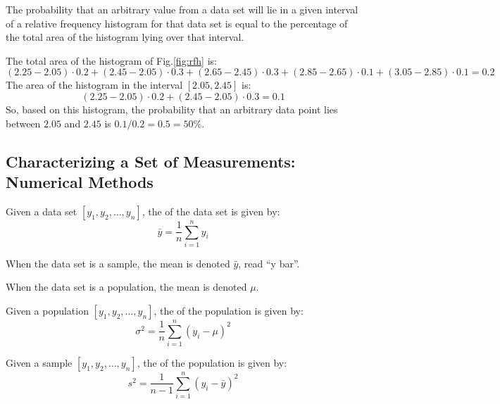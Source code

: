\begin{note}
    The probability that an arbitrary value from a data set will lie in a given interval of a relative frequency histogram for that data set is equal to the percentage of the total area of the histogram lying over that interval.
\end{note}

\begin{exmp}
    The total area of the histogram of Fig.\ref{fig:rfh} is: $$(2.25 - 2.05)\cdot 0.2 + (2.45 - 2.05)\cdot 0.3 + (2.65 - 2.45)\cdot 0.3 + (2.85 - 2.65)\cdot 0.1 + (3.05 - 2.85)\cdot 0.1 = 0.2$$
    The area of the histogram in the interval $[2.05, 2.45]$ is: $$(2.25 - 2.05)\cdot 0.2 + (2.45 - 2.05)\cdot 0.3 = 0.1$$
    So, based on this histogram, the probability that an arbitrary data point lies between $2.05$ and $2.45$ is $0.1 / 0.2 = 0.5 = 50\%$.
\end{exmp}

\subsection{Characterizing a Set of Measurements: Numerical Methods}

\begin{defn}
    Given a data set $[y_{1}, y_{2}, \ldots, y_{n}]$, the  of the data set is given by: $$\bar{y} = \frac{1}{n} \sum_{i=1}^{n} y_{i}$$
\end{defn}

\begin{nota}
    When the data set is a sample, the mean is denoted $\bar{y}$, read ``y bar''.
\end{nota}

\begin{nota}[\idx{$\mu$}]
    When the data set is a population, the mean is denoted $\mu$.
\end{nota}

\begin{defn}
    Given a population $[y_{1}, y_{2}, \ldots, y_{n}]$, the  of the population is given by: $$\sigma^{2} = \frac{1}{n} \sum_{i=1}^{n} (y_{i} - \mu)^{2}$$
\end{defn}

\pagebreak
\begin{defn}
    Given a sample $[y_{1}, y_{2}, \ldots, y_{n}]$, the  of the population is given by: $$s^{2} = \frac{1}{n-1} \sum_{i=1}^{n} (y_{i} - \bar{y})^{2}$$
\end{defn}